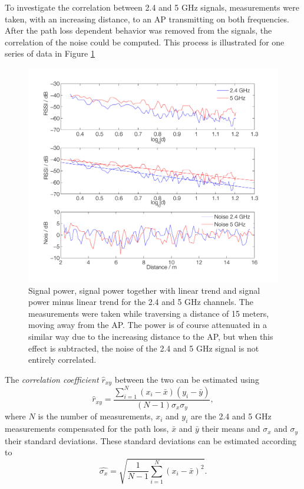 \documentclass{LTHthesis}
\begin{document}
To investigate the correlation between 2.4 and 5 GHz signals, measurements were taken, with an increasing distance, to an AP transmitting on both frequencies. After the path loss dependent behavior was removed from the signals, the correlation of the noise could be computed. This process is illustrated for one series of data in Figure \ref{noise_corr_los} 
%
\begin{figure}[!hbt]

\includegraphics[width=1\textwidth ]{images/wifi/noise_corr_los}
\caption{Signal power, signal power together with linear trend and signal power minus linear trend for the 2.4 and 5 GHz channels. The measurements were taken while traversing a distance of 15 meters, moving away from the AP. The power is of course attenuated in a similar way due to the increasing distance to the AP, but when this effect is subtracted, the noise of the 2.4 and 5 GHz signal is not entirely correlated.}\label{noise_corr_los}
\end{figure}

The \emph{correlation coefficient $\hat  r_{xy}$} between the two can be estimated using
\begin{equation}
\hat r_{xy}=\frac{\sum\limits_{i=1}^{N}{(x_i-\bar{x})(y_i-\bar{y})}}{(N-1)\sigma_x\sigma_y},
\end{equation}
where $N$ is the number of measurements, $x_i$ and $y_i$ are the 2.4 and 5 GHz measurements compensated for the path loss, $\bar x$ and $\bar y$ their means and $\sigma_x$ and $\sigma_y$ their standard deviations. These standard deviations can be estimated according to 
%
\begin{equation}
\hat{\sigma_x} = \sqrt{\frac{1}{N-1}\sum_{i=1}^N(x_i-\bar x)^2}.
\end{equation}
%  
\end{document}
